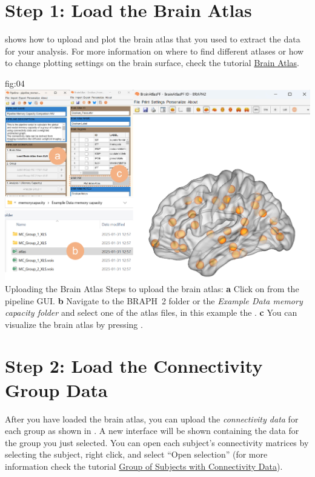 \documentclass[justified]{tufte-handout}
\begin{document}
\clearpage
\section{Step 1: Load the Brain Atlas}


 shows how to upload and plot the brain atlas that you used to extract the data for your analysis. For more information on where to find different atlases or how to change plotting settings on the brain surface, check the tutorial \href{https://github.com/braph-software/BRAPH-2/tree/develop/tutorials/data/tut_ba}{Brain Atlas}.

{fig:04}
{
	\includegraphics{fig04.jpg}
}
{Uploading the Brain Atlas}
{
	Steps to upload the brain atlas:
	{\bf a} Click on  from the pipeline GUI.
	{\bf b} Navigate to the BRAPH~2 folder  or the \emph{Example Data memory capacity folder} and select one of the atlas files, in this example the . 
	{\bf c} You can visualize the brain atlas by pressing . 
}

\clearpage
\section{Step 2: Load the Connectivity Group Data}

After you have loaded the brain atlas, you can upload the \emph{connectivity data} for each group as shown in . A new interface will be shown containing the data for the group you just selected. You can open each subject’s connectivity matrices by selecting the subject, right click, and select “Open selection” (for more information check the tutorial \href{https://github.com/braph-software/BRAPH-2/tree/develop/tutorials/data/tut_gr_con}{Group of Subjects with Connectivity Data}).
\end{document}
